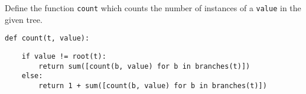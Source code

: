 \begin{blocksection}
\question Define the function \lstinline$count$ which counts the number of instances of a \lstinline$value$ in the given tree.

\begin{lstlisting}
def count(t, value):
\end{lstlisting}

\begin{solution}[1in]
\begin{lstlisting}
    if value != root(t):
        return sum([count(b, value) for b in branches(t)])
    else:
        return 1 + sum([count(b, value) for b in branches(t)])
\end{lstlisting}
\end{solution}
\end{blocksection}
